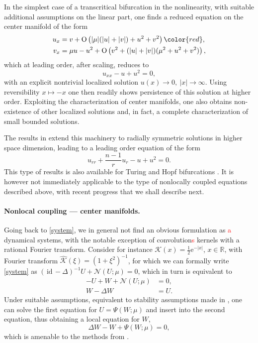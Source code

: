 \documentclass[10pt]{article}
\newcommand{\R}{\mathbb{R}}
\newcommand{\rmO}{\mathrm{O}}
\newcommand{\rme}{\mathrm{e}}
\newcommand{\id}{\mathrm{\,id}\,}
\newcommand{\Nl}{\mathcal{N}}
\newcommand{\K}{\mathcal{K}}
\begin{document}
In the simplest case of a transcritical bifurcation in the nonlinearity, with suitable additional assumptions on the linear part, one finds a reduced equation on the center manifold of the form 
\begin{align*}
u_x&=v+\rmO\left(|\mu|(|u|+|v|)+u^2+v^2\right)\color{red},\\
v_x&=\mu u - u^2 + \rmO\left(v^2+(|u|+|v|)(\mu^2+u^2+v^2)\right),
\end{align*}
which at leading order, after scaling, reduces to 
\begin{equation}\label{e:tc}
u_{xx}- u + u^2=0,
\end{equation}
with an explicit nontrivial localized solution $u(x)\to 0,\ |x|\to\infty$. Using reversibility $x\mapsto -x$ one then readily shows persistence of this solution at higher order. Exploiting the characterization of center manifolds, one also obtains non-existence of other localized solutions and, in fact, a complete characterization of small bounded solutions. 

The results in \cite{Srad} extend this machinery to radially symmetric solutions in higher space dimension, leading to a leading order equation of the form 
\[
u_{rr}+\frac{n-1}{r}u_r - u + u^2=0.
\]
This type of results is also available for Turing and Hopf bifurcations \cite{Srad}. It is however not immediately applicable to the type of nonlocally coupled equations described above, with recent progress that we shall describe next. 


\paragraph{Nonlocal coupling --- center manifolds.} Going back to \eqref{system}, we in general not find an obvious formulation as \textcolor{red}a dynamical systems, with the notable exception of convolution\textcolor{red}s kernels with a rational Fourier transform. Consider for instance $\K(x)=\frac{1}{2}\rme^{-|x|}$, $x\in\R$, with Fourier transform $\hat{\K}(\xi)=(1+\xi^2)^{-1}$, for which we can formally write \eqref{system} as $(\id -\Delta)^{-1}U+\Nl(U;\mu)=0$, which in turn is equivalent to 
\begin{align*}
-U+W+\Nl(U;\mu)&=0,\\
W-\Delta W &=U.
\end{align*}
Under suitable assumptions, equivalent to stability assumptions made in \cite{Srad}, one can solve the first equation for $U=\Psi(W;\mu)$ and insert into the second equation, thus obtaining a local equation for $W$, 
\[
\Delta W -W + \Psi(W;\mu)=0,
\]
which is amenable to the methods from \cite{Srad}. 
\end{document}

